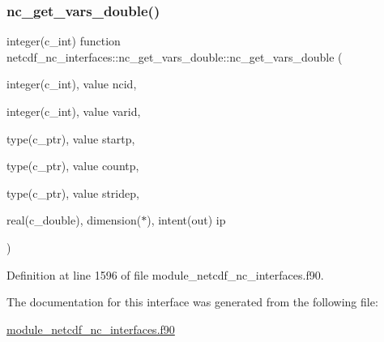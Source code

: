 \subsubsection{\texorpdfstring{nc\+\_\+get\+\_\+vars\+\_\+double()}{nc\_get\_vars\_double()}}
{\footnotesize\ttfamily integer(c\+\_\+int) function netcdf\+\_\+nc\+\_\+interfaces\+::nc\+\_\+get\+\_\+vars\+\_\+double\+::nc\+\_\+get\+\_\+vars\+\_\+double (\begin{DoxyParamCaption}\item[{integer(c\+\_\+int), value}]{ncid,  }\item[{integer(c\+\_\+int), value}]{varid,  }\item[{type(c\+\_\+ptr), value}]{startp,  }\item[{type(c\+\_\+ptr), value}]{countp,  }\item[{type(c\+\_\+ptr), value}]{stridep,  }\item[{real(c\+\_\+double), dimension($\ast$), intent(out)}]{ip }\end{DoxyParamCaption})}



Definition at line 1596 of file module\+\_\+netcdf\+\_\+nc\+\_\+interfaces.\+f90.



The documentation for this interface was generated from the following file\+:\begin{DoxyCompactItemize}
\item 
\hyperlink{module__netcdf__nc__interfaces_8f90}{module\+\_\+netcdf\+\_\+nc\+\_\+interfaces.\+f90}\end{DoxyCompactItemize}
